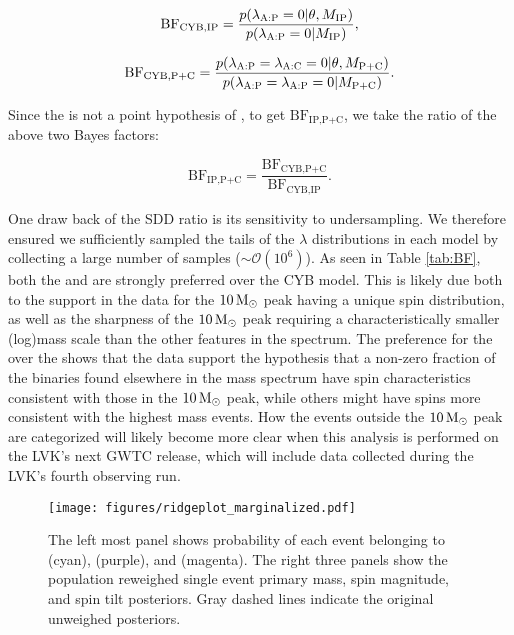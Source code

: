 \begin{equation} \label{eq:BF1}
\text{BF}_{\text{CYB,IP}} = \frac{p(\lambda_\textsc{A:P} = 0 | \theta, M_\text{IP})}{p(\lambda_\textsc{A:P} = 0 | M_\text{IP})},
\end{equation}

\begin{equation}\label{eq:BF2}
  \text{BF}_{\text{CYB,P+C}} = \frac{p(\lambda_\textsc{A:P} = \lambda_\textsc{A:C}= 0 | \theta, M_\text{P+C})}{p(\lambda_\textsc{A:P} = \lambda_\textsc{A:P} = 0 | M_\text{P+C})}.
\end{equation}

Since the \base{} is not a point hypothesis of \comp{}, to get $\text{BF}_\text{IP,P+C}$, we take the ratio of the above two Bayes factors:

\begin{equation}\label{eq:BF1}
  \text{BF}_\text{IP,P+C} = \frac{\text{BF}_{\text{CYB,P+C}}}{\text{BF}_{\text{CYB,IP}}}.
\end{equation}

One draw back of the SDD ratio is its sensitivity to undersampling. We therefore ensured we sufficiently sampled the tails of the $\lambda$ distributions in each model by collecting a large number of samples ($\sim\mathcal{O}(10^6)$). 
As seen in Table \ref{tab:BF}, both the \base{} and \comp{} are strongly preferred over the CYB model. This is likely due both to the support in the data for the $10{\,\rm M}_\odot$ peak having a unique spin distribution, as well as the sharpness of the $10 {\,\rm M}_\odot$ peak requiring a characteristically smaller  (log)mass scale than the other features in the spectrum. The preference for the \comp{} over the \base{} shows that the data support the hypothesis that a non-zero fraction of the binaries found elsewhere in the mass spectrum have spin characteristics consistent with those in the $10 {\,\rm M}_\odot$ peak, while others might have spins more consistent with the highest mass events. How the events outside the $10 {\,\rm M}_\odot$ peak are categorized will likely become more clear when this analysis is performed on the LVK's next GWTC release, which will include data collected during the LVK's fourth observing run.




\begin{figure*}[]
    \begin{centering}
        \texttt{[image: figures/ridgeplot\_marginalized.pdf]}
        \caption{The left most panel shows probability of each event belonging to \first{} (cyan), \contA{} (purple), and \contB{} (magenta). The right three panels show the population reweighed single event primary mass, spin magnitude, and spin tilt posteriors. Gray dashed lines indicate the original unweighed posteriors.}
        \label{fig:ridgeplot}
    \end{centering}
\end{figure*}



